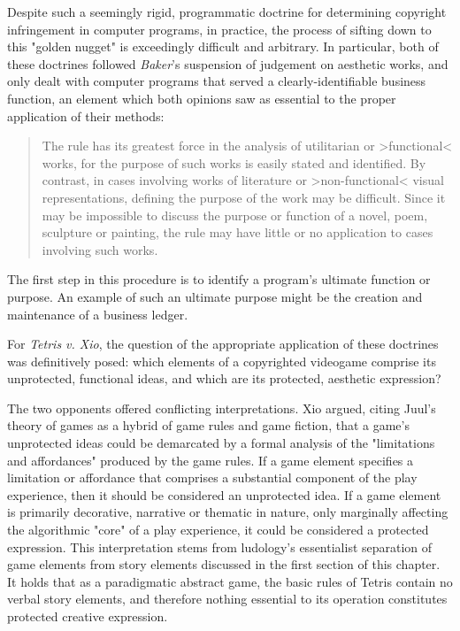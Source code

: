 Despite such a seemingly rigid, programmatic doctrine for determining copyright infringement in computer programs, in practice, the process of sifting down to this "golden nugget" is exceedingly difficult and arbitrary. In particular, both of these doctrines followed \emph{Baker}'s suspension of judgement on aesthetic works, and only dealt with computer programs that served a clearly-identifiable business function, an element which both opinions saw as essential to the proper application of their methods:

\blockcquote[1238]{whelan-jaslow}{
  The rule has its greatest force in the analysis of utilitarian or >functional< works, for the purpose of such works is easily stated and identified. By contrast, in cases involving works of literature or >non-functional< visual representations, defining the purpose of the work may be difficult. Since it may be impossible to discuss the purpose or function of a novel, poem, sculpture or painting, the rule may have little or no application to cases involving such works.
}

\begin{quoting}
  The first step in this procedure is to identify a program's ultimate function or purpose. An example of such an ultimate purpose might be the creation and maintenance of a business ledger. \autocite[697]{altai}
\end{quoting}
For \emph{Tetris v. Xio}, the question of the appropriate application of these doctrines was definitively posed: which elements of a copyrighted videogame comprise its unprotected, functional ideas, and which are its protected, aesthetic expression?

The two opponents offered conflicting interpretations. Xio argued, citing Juul's theory of games as a hybrid of game rules and game fiction, that a game's unprotected ideas could be demarcated by a formal analysis of the "limitations and affordances" produced by the game rules. If a game element specifies a limitation or affordance that comprises a substantial component of the play experience, then it should be considered an unprotected idea. If a game element is primarily decorative, narrative or thematic in nature, only marginally affecting the algorithmic "core" of a play experience, it could be considered a protected expression. This interpretation stems from ludology's essentialist separation of game elements from story elements discussed in the first section of this chapter. It holds that as a paradigmatic abstract game, the basic rules of Tetris contain no verbal story elements, and therefore nothing essential to its operation constitutes protected creative expression.

